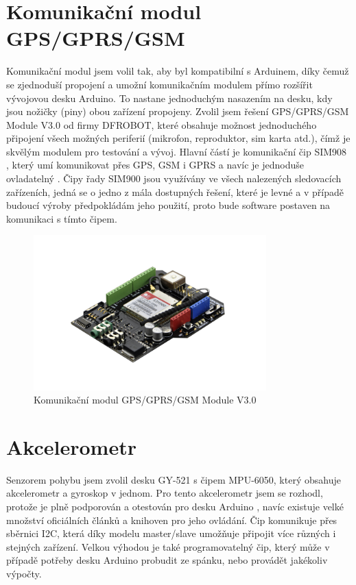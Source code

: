 \documentclass[FM,MP]{tulthesis}  %
\begin{document}
\section{Komunikační modul GPS/GPRS/GSM}
Komunikační modul jsem volil tak, aby byl kompatibilní s Arduinem, díky čemuž se zjednoduší propojení a umožní komunikačním modulem přímo rozšířit vývojovou desku Arduino. To nastane jednoduchým nasazením na desku, kdy jsou nožičky (piny) obou zařízení propojeny. Zvolil jsem řešení GPS/GPRS/GSM Module V3.0 \cite{ROBOT schematic} od firmy DFROBOT, které obsahuje možnost jednoduchého připojení všech možných periferií (mikrofon, reproduktor, sim karta atd.), čímž je skvělým modulem pro testování a vývoj. Hlavní částí je komunikační čip SIM908 \cite{SIMCOM HW}, který umí komunikovat přes GPS, GSM i GPRS a navíc je jednoduše ovladatelný \cite{SIMCOM SW}. Čipy řady SIM900 jsou využívány ve všech nalezených sledovacích zařízeních, jedná se o jedno z mála dostupných řešení, které je levné a v případě budoucí výroby předpokládám jeho použití, proto bude software postaven na komunikaci s tímto čipem.

\begin{figure}[H]
\begin{center}
\includegraphics[width=0.8\textwidth]{images/module.png}
\caption{Komunikační modul GPS/GPRS/GSM Module V3.0}
\label{image}
\end{center}
\end{figure}

\section{Akcelerometr}
Senzorem pohybu jsem zvolil desku GY-521 s čipem MPU-6050, který obsahuje akcelerometr a gyroskop v jednom. Pro tento akcelerometr jsem se rozhodl, protože je plně podporován a otestován pro desku Arduino \cite{Arduino acce}, navíc existuje velké množství oficiálních článků a knihoven \cite{I2cdevlib} pro jeho ovládání. Čip komunikuje přes sběrnici I2C, která díky modelu master/slave umožňuje připojit více různých i stejných zařízení. Velkou výhodou je také programovatelný čip, který může v případě potřeby desku Arduino probudit ze spánku, nebo provádět jakékoliv výpočty.
\end{document}
